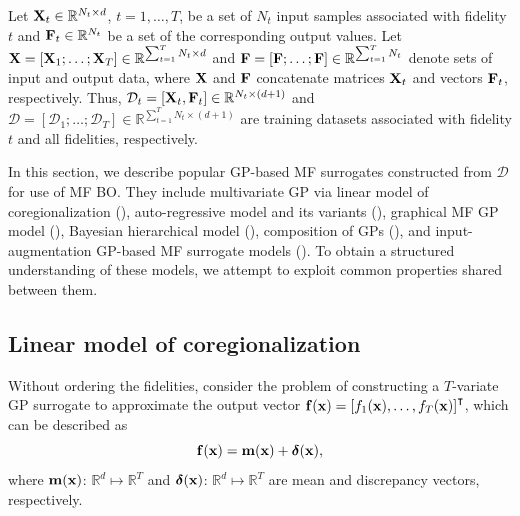\documentclass[iicol,sn-basic]{sn-jnl}%
\begin{document}
Let ${\bf X}_{t}\in \mathbb{R}^{N_t \times d}$, $t=1,\dots,T$, be a set of $N_t$ input samples associated with fidelity $t$ and ${\bf F}_{t}\in \mathbb{R}^{N_t}$ be a set of the corresponding output values.
Let ${\bf X}=[{\bf X}_1;\dots;{\bf X}_T] \in \mathbb{R}^{\sum_{t=1}^{T} N_t \times d}$ and ${\bf F}=[{\bf F};\dots;{\bf F}] \in \mathbb{R}^{\sum_{t=1}^{T} N_t}$ denote sets of input and output data, where ${\bf X}$ and ${\bf F}$ concatenate matrices ${\bf X}_t$ and vectors ${\bf F}_t$, respectively. 
Thus, $\mathcal{D}_t=[{\bf X}_t,{\bf F}_t] \in \mathbb{R}^{N_t \times (d+1)}$ and $\mathcal{D}=[\mathcal{D}_1;\dots;\mathcal{D}_T] \in \mathbb{R}^{\sum_{t=1}^{T} N_t \times (d+1)}$ are training datasets associated with fidelity $t$ and all fidelities, respectively.

In this section, we describe popular GP-based MF surrogates constructed from $\mathcal{D}$ for use of MF BO.
They include multivariate GP via linear model of coregionalization (), auto-regressive model and its variants (), graphical MF GP model (), Bayesian hierarchical model (), composition of GPs (), and input-augmentation GP-based MF surrogate models ().
To obtain a structured understanding of these models, we attempt to exploit common properties shared between them.

\subsection{Linear model of coregionalization}\label{Sec41}

Without ordering the fidelities, consider the problem of constructing a $T$-variate GP surrogate to approximate the output vector ${\bf f}({\bf x})=\left[f_1({\bf x}),\dots,f_T({\bf x})\right]^\intercal$, which can be described as
\begin{equation}\label{eqn4}
	{\bf f}({\bf x}) = {\bf m}({\bf x}) + {\boldsymbol \delta}({\bf x}),
\end{equation}
where ${\bf m}({\bf x})$: $\mathbb{R}^d \mapsto \mathbb{R}^T$  and ${\boldsymbol \delta}({\bf x})$: $\mathbb{R}^d \mapsto \mathbb{R}^T$ are mean and discrepancy vectors, respectively.
\end{document}
